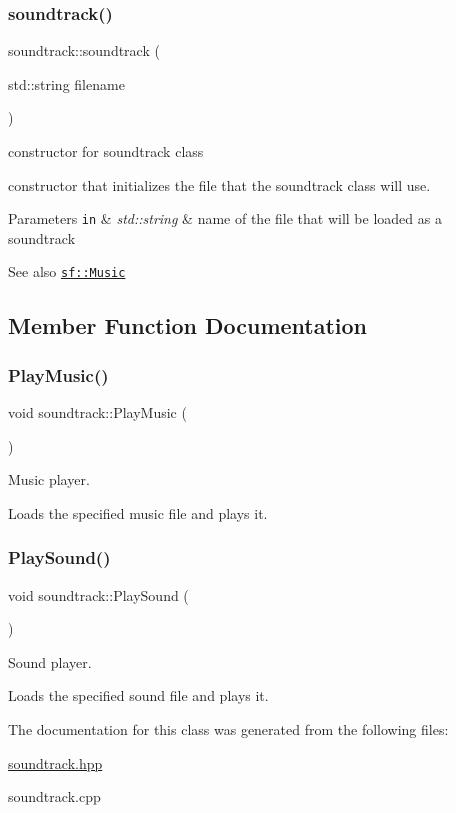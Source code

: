 \subsubsection{\texorpdfstring{soundtrack()}{soundtrack()}}
{\footnotesize\ttfamily soundtrack\+::soundtrack (\begin{DoxyParamCaption}\item[{std\+::string}]{filename }\end{DoxyParamCaption})}



constructor for soundtrack class 

constructor that initializes the file that the soundtrack class will use.


\begin{DoxyParams}[1]{Parameters}
\mbox{\tt in}  & {\em std\+::string} & name of the file that will be loaded as a soundtrack\\
\hline
\end{DoxyParams}
\begin{DoxySeeAlso}{See also}
\href{http://www.sfml-dev.org/documentation/2.0/classsf_1_1Music.php}{\tt sf\+::\+Music} 
\end{DoxySeeAlso}


\subsection{Member Function Documentation}
\mbox{\label{classsoundtrack_a9bc49316f0c8607aef388728d2ca28db}} 
\subsubsection{\texorpdfstring{Play\+Music()}{PlayMusic()}}
{\footnotesize\ttfamily void soundtrack\+::\+Play\+Music (\begin{DoxyParamCaption}{ }\end{DoxyParamCaption})}



Music player. 

Loads the specified music file and plays it. \mbox{\label{classsoundtrack_a3c86452d68b41eea981d0df4984713e8}} 
\subsubsection{\texorpdfstring{Play\+Sound()}{PlaySound()}}
{\footnotesize\ttfamily void soundtrack\+::\+Play\+Sound (\begin{DoxyParamCaption}{ }\end{DoxyParamCaption})}



Sound player. 

Loads the specified sound file and plays it. 

The documentation for this class was generated from the following files\+:\begin{DoxyCompactItemize}
\item 
\hyperlink{soundtrack_8hpp}{soundtrack.\+hpp}\item 
soundtrack.\+cpp\end{DoxyCompactItemize}
